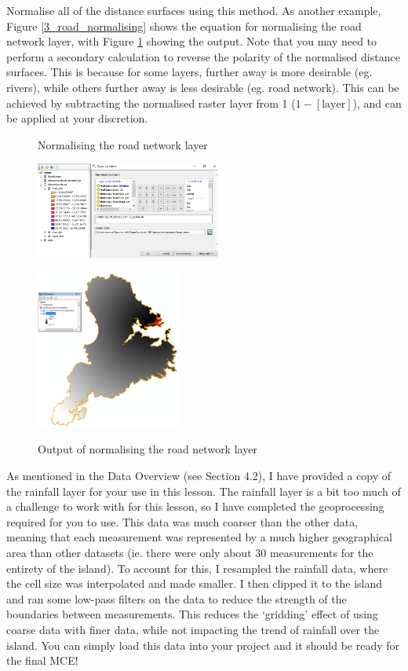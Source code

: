 \documentclass{article}
\begin{document}
Normalise all of the distance surfaces using this method. As another example, Figure \ref{3_road_normalising} shows the equation for normalising the road network layer, with Figure \ref{3_road_normalising_output} showing the output. Note that you may need to perform a secondary calculation to reverse the polarity of the normalised distance surfaces. This is because for some layers, further away is more desirable (eg. rivers), while others further away is less desirable (eg. road network). This can be achieved by subtracting the normalised raster layer from 1 ($1-[\text{layer}]$), and can be applied at your discretion. 
\pagebreak

\begin{figure}[h]
  \centering
  \begin{minipage}[b]{0.4\textwidth}
    \centering
    \caption{Normalising the road network layer}
    \includegraphics[width=230px]{images/part3/road_normalising.PNG}
    \label{3_road_normalising}
  \end{minipage}
  \hfill
  \begin{minipage}[b]{0.4\textwidth}
    \centering
    \caption{Output of normalising the road network layer}
    \includegraphics[width=180px]{images/part3/road_normalising_output.PNG}
    \label{3_road_normalising_output}
  \end{minipage}
\end{figure}

As mentioned in the Data Overview (see Section 4.2), I have provided a copy of the rainfall layer for your use in this lesson. The rainfall layer is a bit too much of a challenge to work with for this lesson, so I have completed the geoprocessing required for you to use. This data was much coarser than the other data, meaning that each measurement was represented by a much higher geographical area than other datasets (ie. there were only about 30 measurements for the entirety of the island). To account for this, I resampled the rainfall data, where the cell size was interpolated and made smaller. I then clipped it to the island and ran some low-pass filters on the data to reduce the strength of the boundaries between measurements. This reduces the `gridding' effect of using coarse data with finer data, while not impacting the trend of rainfall over the island. You can simply load this data into your project and it should be ready for the final MCE! \\
\end{document}
